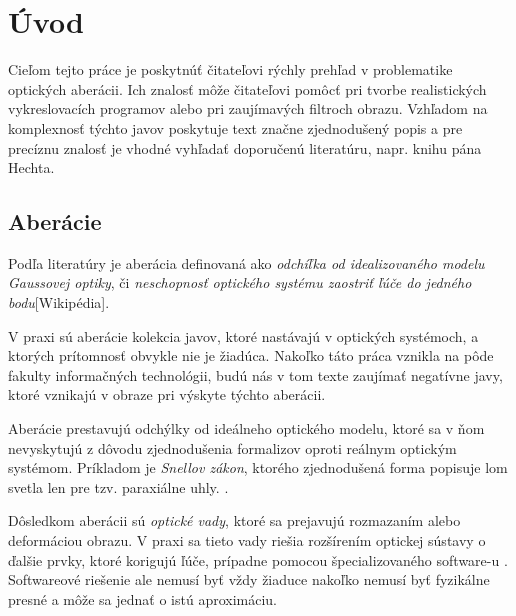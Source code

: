 \chapter{Úvod}
Cieľom tejto práce je poskytnúť čitateľovi rýchly prehľad v problematike optických aberácii.
Ich znalosť môže čitateľovi pomôcť pri tvorbe realistických vykreslovacích programov alebo
pri zaujímavých filtroch obrazu. Vzhľadom na komplexnosť týchto javov poskytuje text značne 
zjednodušený popis a pre precíznu znalosť je vhodné vyhľadať doporučenú literatúru, napr. knihu pána
Hechta\cite{hechtoptics}.

\section{Aberácie}
Podľa literatúry je aberácia definovaná ako \textit{odchíľka od idealizovaného modelu Gaussovej
optiky}\cite{hechtoptics}, či \textit{neschopnosť optického systému zaostriť ľúče do jedného bodu}[Wikipédia].

V praxi sú aberácie kolekcia javov, ktoré nastávajú v optických systémoch, a ktorých prítomnosť
obvykle nie je žiadúca. Nakoľko táto práca vznikla na pôde fakulty informačných technológii, budú
nás v tom texte zaujímať negatívne javy, ktoré vznikajú v obraze pri výskyte týchto aberácii.

Aberácie prestavujú odchýlky od ideálneho optického modelu, ktoré sa v ňom nevyskytujú z dôvodu
zjednodušenia formalizov oproti reálnym optickým systémom. Príkladom je \textit{Snellov zákon},
ktorého zjednodušená forma popisuje lom svetla len pre tzv. paraxiálne uhly. \cite{hechtoptics}.

Dôsledkom aberácii sú \textit{optické vady}, ktoré sa prejavujú rozmazaním alebo deformáciou obrazu. V praxi sa tieto
vady riešia rozšírením optickej sústavy o ďalšie prvky, ktoré korigujú ľúče, prípadne pomocou
špecializovaného software-u \cite{automaticRemovalCA}. Softwareové riešenie ale nemusí byť vždy žiaduce nakoľko nemusí
byť fyzikálne presné a môže sa jednať o istú aproximáciu.

